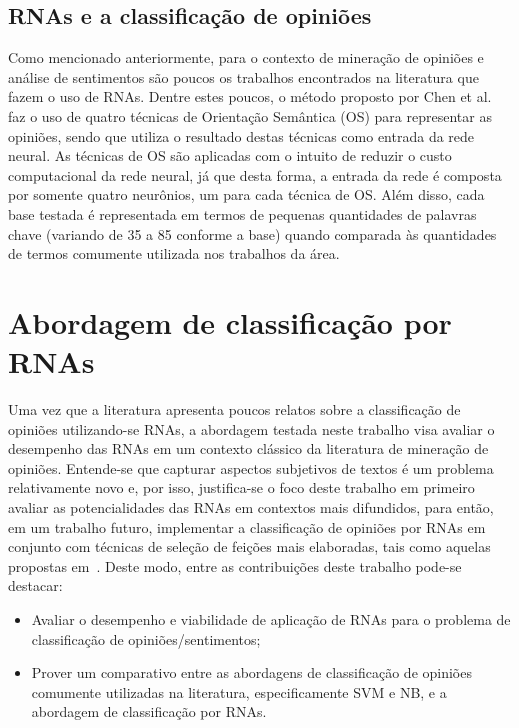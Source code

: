 \documentclass[11pt,a4paper]{article}
\begin{document}
\subsection{RNAs e a classificação de opiniões}

Como mencionado anteriormente, para o contexto de mineração de opiniões e análise de sentimentos são poucos os trabalhos encontrados na literatura que fazem o uso de RNAs. Dentre estes poucos, o método proposto por Chen et al.~\cite{Chen:blogosphere} faz o uso de quatro técnicas de Orientação Semântica (OS) \cite{Tang:so} para representar as opiniões, sendo que utiliza o resultado destas técnicas como entrada da rede neural. As técnicas de OS são aplicadas com o intuito de reduzir o custo computacional da rede neural, já que desta forma, a entrada da rede é composta por somente quatro neurônios, um para cada técnica de OS. Além disso, cada base testada é representada em termos de pequenas quantidades de palavras chave (variando de 35 a 85 conforme a base) quando comparada às quantidades de termos comumente utilizada nos trabalhos da área.




\section{Abordagem de classificação por RNAs}\label{sec:abordagem}


Uma vez que a literatura apresenta poucos relatos sobre a classificação de opiniões utilizando-se RNAs, a abordagem testada neste trabalho visa avaliar o desempenho das RNAs em um contexto clássico da literatura de mineração de opiniões. Entende-se que capturar aspectos subjetivos de textos é um problema relativamente novo e, por isso, justifica-se o foco deste trabalho em primeiro avaliar as potencialidades das RNAs em contextos mais difundidos, para então, em um trabalho futuro, implementar a classificação de opiniões por RNAs em conjunto com técnicas de seleção de feições mais elaboradas, tais como aquelas propostas em~\cite{Zaidan:Rationales,Whitelaw:Appraisal,Pang04:Subjectivity}. Deste modo, entre as contribuições deste trabalho pode-se destacar:

\begin{itemize}
  \item Avaliar o desempenho e viabilidade de aplicação de RNAs para o problema de classificação de opiniões/sentimentos;
  \item Prover um comparativo entre as abordagens de classificação de opiniões comumente utilizadas na literatura, especificamente SVM e NB, e a abordagem de classificação por RNAs.
\end{itemize}
\end{document}
